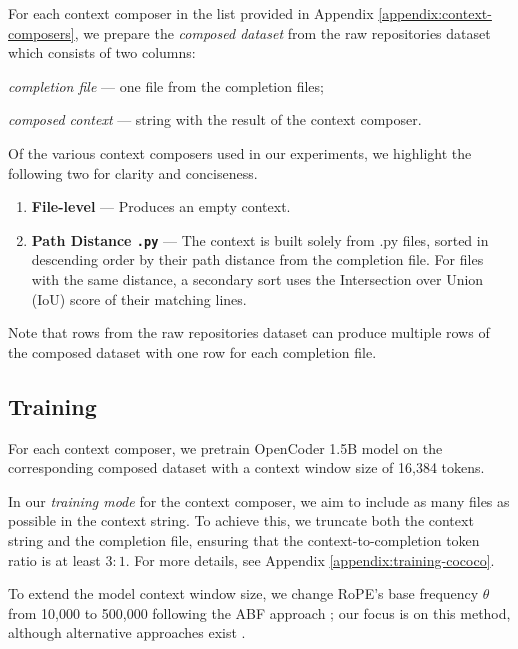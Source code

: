 For each context composer in the list provided in Appendix \ref{appendix:context-composers}, we prepare the \textit{composed dataset} from the raw repositories dataset which consists of two columns:
\begin{inparaenum}[(1)]
    \item \textit{completion file} --- one file from the completion files;
    \item \textit{composed context} --- string with the result of the context composer.
\end{inparaenum}

Of the various context composers used in our experiments, we highlight the following two for clarity and conciseness.
\begin{enumerate}
    \item \textbf{File-level} — Produces an empty context.
    
    \item \textbf{Path Distance \texttt{.py}} — The context is built solely from .py files, sorted in descending order by their path distance from the completion file. For files with the same distance, a secondary sort uses the Intersection over Union (IoU) score of their matching lines.
\end{enumerate}

Note that rows from the raw repositories dataset can produce multiple rows of the composed dataset with one row for each completion file.

\subsection{Training}
For each context composer, we pretrain OpenCoder 1.5B model \citep{opencoder} on the corresponding composed dataset with a context window size of 16,384 tokens.

In our \textit{training mode} for the context composer, we aim to include as many files as possible in the context string. To achieve this, we truncate both the context string and the completion file, ensuring that the context-to-completion token ratio is at least $3:1$. For more details, see Appendix \ref{appendix:training-cococo}.

To extend the model context window size, we change RoPE's base frequency $\theta$ from 10,000 to 500,000 following the ABF approach \citep{RoPE-ABF}; our focus is on this method, although alternative approaches exist \citep{positional-interpolation, yarn, rope-extensions, rope-scaling-laws}.

